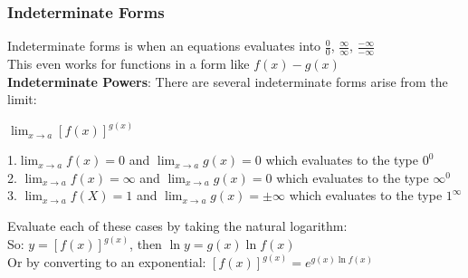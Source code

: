 \documentclass[10pt,a4paper]{article}
\begin{document}
\subsubsection{Indeterminate Forms}
Indeterminate forms is when an equations evaluates into $\frac{0}{0}$, $\frac{\infty}{\infty}$, $\frac{-\infty}{-\infty}$
\\This even works for functions in a form like $f(x) - g(x)$
\\  \textbf{Indeterminate Powers}:
There are several indeterminate forms arise from the limit:
\begin{center}
	$\lim_{x\rightarrow a}{[f(x)]^{g(x)}}$
\end{center}
1.$\lim_{x \rightarrow a}{f(x)} = 0$ and $ \lim_{x \rightarrow a}{g(x)} = 0$ which evaluates to the type $0^{0}$
\\2. $\lim_{x \rightarrow a}{f(x)} = \infty$ and $\lim_{x \rightarrow a}{g(x)} = 0$ which evaluates to the type $\infty^{0}$
\\ 3. $\lim_{x \rightarrow a}{f(X)} = 1$ and $\lim_{x \rightarrow a}{g(x)} = \pm \infty $ which evaluates to the type $1^{\infty}$

Evaluate each of these cases by taking the natural logarithm: 
\\ So: $y=[f(x)]^{g(x)}$, then $\ln y = g(x) \ln f(x)$
\\ Or by converting to an exponential: $[f(x)]^{g(x)} = e^{g(x)\ln f(x)}$



	
\end{document}
